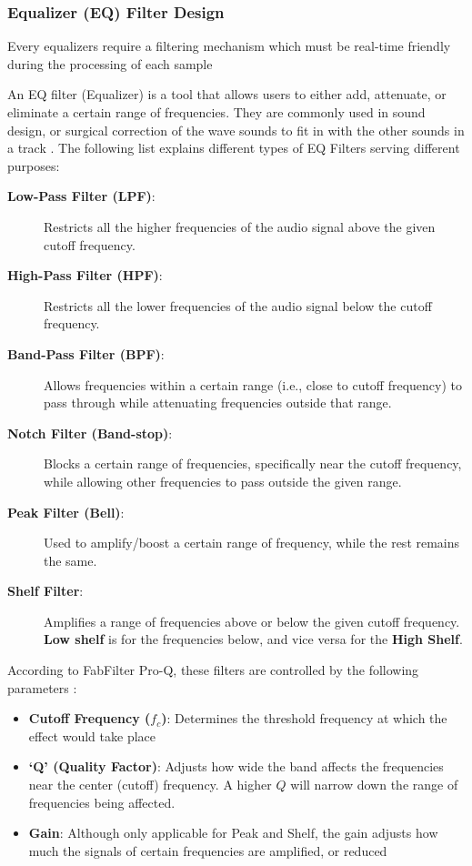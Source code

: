 \subsubsection{Equalizer (EQ) Filter Design}

Every equalizers require a filtering mechanism which must be real-time friendly
during the processing of each sample

An EQ filter (Equalizer) is a tool that allows users to either add, attenuate, or eliminate
a certain range of frequencies. They are commonly used in sound design, or surgical
correction of the wave sounds to fit in with the other sounds in a track \cite{musicguymixing_2024}. The following
list explains different types of EQ Filters serving different purposes:

\begin{description}
    \item[\textbf{Low-Pass Filter (LPF)}:] Restricts all the higher frequencies of the audio signal above the given cutoff frequency.
    \item[\textbf{High-Pass Filter (HPF)}:] Restricts all the lower frequencies of the audio signal below the cutoff frequency.
    \item[\textbf{Band-Pass Filter (BPF)}:] Allows frequencies within a certain range (i.e., close to cutoff frequency) to pass through while 
    attenuating frequencies outside that range.
    \item[\textbf{Notch Filter (Band-stop)}:] Blocks a certain range of frequencies, specifically near the cutoff frequency, while 
    allowing other frequencies to pass outside the given range.
    \item[\textbf{Peak Filter (Bell)}:] Used to amplify/boost a certain range of frequency, while the rest remains the same.
    \item[\textbf{Shelf Filter}:] Amplifies a range of frequencies above or below the given cutoff frequency. \textbf{Low shelf} is for the frequencies below, 
    and vice versa for the \textbf{High Shelf}.
\end{description}

According to FabFilter Pro-Q, these filters are controlled by the following parameters \cite{Whitehouse_2021}:
\begin{itemize}
    \item \textbf{Cutoff Frequency ($f_c$)}: Determines the threshold frequency at which the effect would take place
    \item \textbf{`Q' (Quality Factor)}: Adjusts how wide the band affects the frequencies near the center (cutoff) frequency. 
    A higher $Q$ will narrow down the range of frequencies being affected.
    \item \textbf{Gain}: Although only applicable for Peak and Shelf, the gain adjusts how much the signals of certain frequencies are amplified, or reduced
\end{itemize}

